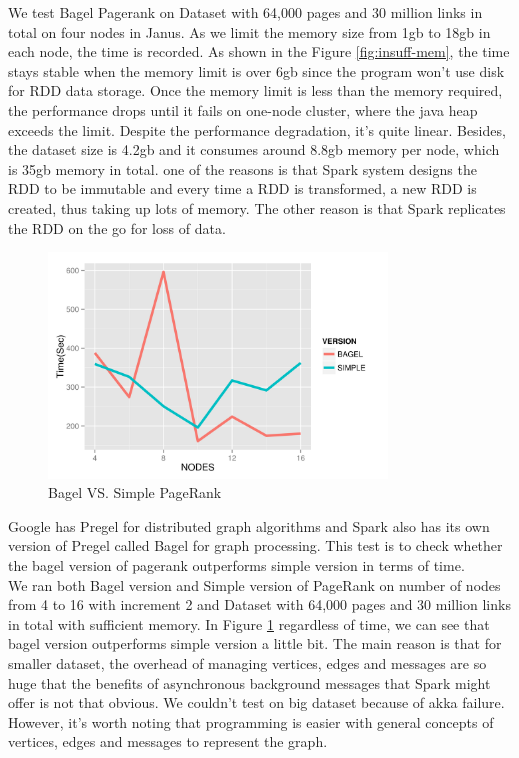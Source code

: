 \documentclass{article}
\begin{document}
We test Bagel Pagerank on Dataset with 64,000 pages and 30 million links in total on four nodes in Janus. As we limit the memory size from 1gb to 18gb in each node, the time is recorded. As shown in the Figure \ref{fig:insuff-mem}, the time stays stable when the memory limit is over 6gb since the program won’t use disk for RDD data storage. Once the memory limit is less than the memory required, the performance drops until it fails on one-node cluster, where the java heap exceeds the limit. Despite the performance degradation, it’s quite linear. Besides, the dataset size is 4.2gb and it consumes around 8.8gb memory per node, which is 35gb memory in total. one of the reasons is that Spark system designs the RDD to be immutable and every time a RDD is transformed, a new RDD is created, thus taking up lots of memory. The other reason is that Spark replicates the RDD on the go for loss of data.\\

\begin{figure}[H]
        \centering
        \includegraphics[width=90mm]{images/bagelsimple.png}
        \caption{Bagel VS. Simple PageRank}
        \label{fig:bagelsimple}
    \end{figure}

Google has Pregel for distributed graph algorithms and Spark also has its own version of Pregel called Bagel for graph processing. This test is to check whether the bagel version of pagerank outperforms simple version in terms of time.\\

We ran both Bagel version and Simple version of PageRank on number of nodes from 4 to 16 with increment 2 and Dataset with 64,000 pages and 30 million links in total with sufficient memory. In Figure \ref{fig:bagelsimple} regardless of time, we can see that bagel version outperforms simple version a little bit. The main reason is that for smaller dataset, the overhead of managing vertices, edges and messages are so huge that the benefits of asynchronous background messages that Spark might offer is not that obvious. We couldn’t test on big dataset because of akka failure. However, it’s worth noting that programming is easier with general concepts of vertices, edges and messages to represent the graph.\\
\end{document}
